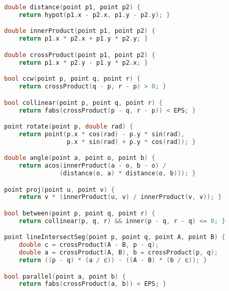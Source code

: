 \begin{lstlisting}[language=C++, title=Parte 2: Operações]
double distance(point p1, point p2) {
	return hypot(p1.x - p2.x, p1.y - p2.y); }

double innerProduct(point p1, point p2) {
	return p1.x * p2.x + p1.y * p2.y; }

double crossProduct(point p1, point p2) {
	return p1.x * p2.y - p1.y * p2.x; }

bool ccw(point p, point q, point r) {
	return crossProduct(q - p, r - p) > 0; }

bool collinear(point p, point q, point r) {
	return fabs(crossProduct(p - q, r - p)) < EPS; }

point rotate(point p, double rad) {
	return point(p.x * cos(rad) - p.y * sin(rad), 
	             p.x * sin(rad) + p.y * cos(rad)); }

double angle(point a, point o, point b) {
	return acos(innerProduct(a - o, b - o) / 
	           (distance(o, a) * distance(o, b))); }

point proj(point u, point v) {
	return v * (innerProduct(u, v) / innerProduct(v, v)); }

bool between(point p, point q, point r) {
	return collinear(p, q, r) && inner(p - q, r - q) <= 0; }

point lineIntersectSeg(point p, point q, point A, point B) {
	double c = crossProduct(A - B, p - q);
	double a = crossProduct(A, B), b = crossProduct(p, q);
	return ((p - q) * (a / c)) - ((A - B) * (b / c)); }

bool parallel(point a, point b) {
	return fabs(crossProduct(a, b)) < EPS; }

\end{lstlisting}

\newpage

